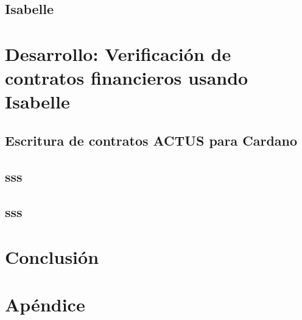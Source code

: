 \documentclass[12pt]{book}
\begin{document}
\section{Isabelle}


\chapter[Verificación de contratos financieros en Isabelle]{Desarrollo: Verificación de contratos financieros usando Isabelle}
\section{Escritura de contratos ACTUS para Cardano}
\section{sss}
\section{sss}


\chapter{Conclusión}


\chapter{Apéndice}




\end{document}
